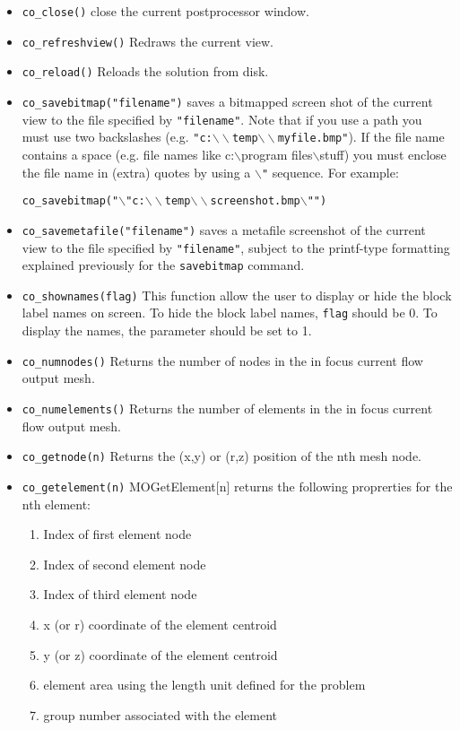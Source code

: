 \begin{itemize}

\item \texttt{co\_close()} close the current postprocessor window.

\item{\tt co\_refreshview()} Redraws the current view.

\item{\tt co\_reload()} Reloads the solution from disk.

\item \texttt{co\_savebitmap("filename")} saves a bitmapped screen shot of the current
view to the file specified by \texttt{"filename"}. Note that if you
use a path you must use two backslashes (e.g.
\texttt{"c:$\backslash \backslash $temp$\backslash \backslash
$myfile.bmp"}). If the file name contains a space (e.g. file
names like c:$\backslash $program files$\backslash $stuff) you must
enclose the file name in (extra) quotes by using a
\texttt{$\backslash $"} sequence. For example:

\texttt{co\_savebitmap("$\backslash $"c:$\backslash \backslash
$temp$\backslash \backslash $screenshot.bmp$\backslash $"")}

\item \texttt{co\_savemetafile("filename")} saves a metafile screenshot of the current
view to the file specified by \texttt{"filename"}, subject to the
printf-type formatting explained previously for the
\texttt{savebitmap} command.

\item \texttt{co\_shownames(flag)} This function allow the user to display or hide the
block label names on screen. To hide the block label names,
\texttt{flag} should be 0. To display the names, the parameter
should be set to 1.


\item{\tt co\_numnodes()} Returns the number of nodes in the in focus current flow output mesh.
\item{\tt co\_numelements()} Returns the number of elements in the in focus current flow output mesh.
\item{\tt co\_getnode(n)} Returns the (x,y) or (r,z) position of the nth mesh node.
\item{\tt co\_getelement(n)} MOGetElement[n] returns the following proprerties for the nth element:
    \begin{enumerate}
        \item Index of first element node
        \item Index of second element node
        \item Index of third element node
        \item x (or r) coordinate of the element centroid
        \item y (or z) coordinate of the element centroid
        \item element area using the length unit defined for the problem
        \item group number associated with the element
    \end{enumerate}

\end{itemize}
